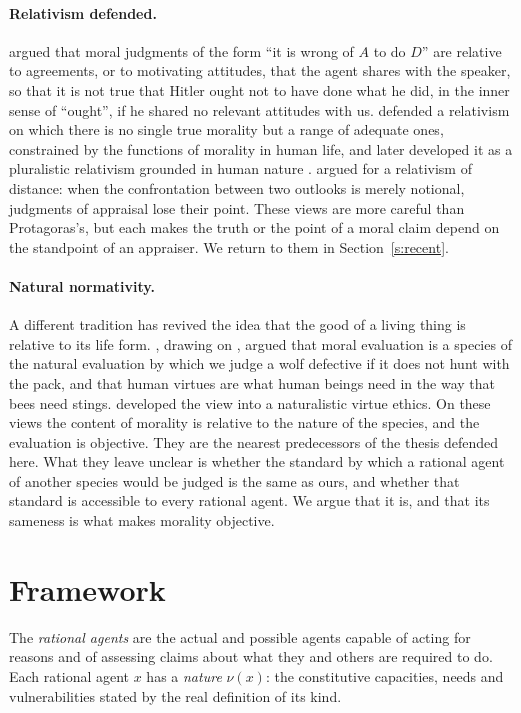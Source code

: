 \documentclass{situationist-preprint}
\begin{document}
\paragraph{Relativism defended.} \citet{Harman1975} argued that moral judgments of the form \enquote{it is wrong of $A$ to do $D$} are relative to agreements, or to motivating attitudes, that the agent shares with the speaker, so that it is not true that Hitler ought not to have done what he did, in the inner sense of \enquote{ought}, if he shared no relevant attitudes with us. \citet{Wong1984} defended a relativism on which there is no single true morality but a range of adequate ones, constrained by the functions of morality in human life, and later developed it as a pluralistic relativism grounded in human nature \citep{Wong2006}. \citet{Williams1985} argued for a relativism of distance: when the confrontation between two outlooks is merely notional, judgments of appraisal lose their point. These views are more careful than Protagoras's, but each makes the truth or the point of a moral claim depend on the standpoint of an appraiser. We return to them in Section~\ref{s:recent}.

\paragraph{Natural normativity.} A different tradition has revived the idea that the good of a living thing is relative to its life form. \citet{Foot2001}, drawing on \citet{Thompson2008}, argued that moral evaluation is a species of the natural evaluation by which we judge a wolf defective if it does not hunt with the pack, and that human virtues are what human beings need in the way that bees need stings. \citet{Hursthouse1999} developed the view into a naturalistic virtue ethics. On these views the content of morality is relative to the nature of the species, and the evaluation is objective. They are the nearest predecessors of the thesis defended here. What they leave unclear is whether the standard by which a rational agent of another species would be judged is the same as ours, and whether that standard is accessible to every rational agent. We argue that it is, and that its sameness is what makes morality objective.

\section{Framework}\label{s:framework}

\begin{definition}\label{d:agents}
The \emph{rational agents} are the actual and possible agents capable of acting for reasons and of assessing claims about what they and others are required to do. Each rational agent $x$ has a \emph{nature} $\nu(x)$: the constitutive capacities, needs and vulnerabilities stated by the real definition of its kind.
\end{definition}
\end{document}
